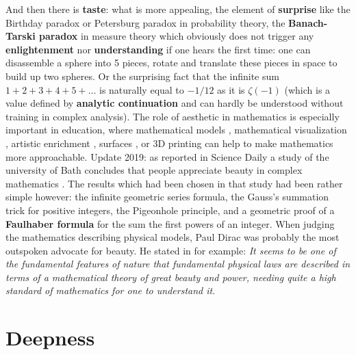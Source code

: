 \documentclass[12pt]{amsart}
\newcounter{example}    \def\example#1{ \item \fontsize{12}{15} \selectfont #1 \fontsize{12}{15} \selectfont }
\begin{document}
And then there is {\bf taste}: what is more appealing, the element of {\bf surprise} like the Birthday paradox
or Petersburg paradox in probability theory, the {\bf Banach-Tarski
paradox} in measure theory which obviously does not trigger any {\bf enlightenment} nor
{\bf understanding} if one hears the first time:
one can disassemble a sphere into 5 pieces, rotate and translate these pieces in space
to build up two spheres. Or the surprising fact that the infinite sum $1+2+3+4+5+ \dots$ 
is naturally equal to $-1/12$ as it is $\zeta(-1)$ (which is a value defined by 
{\bf analytic continuation} and can hardly be understood without training in complex analysis).
The role of aesthetic in mathematics is especially important in education, where
mathematical models \cite{FischerModels}, mathematical visualization \cite{Banchoff1990},
artistic enrichment \cite{Fomenko}, 
surfaces \cite{AnalyticSurfaces}, or 3D printing \cite{Segerman2016,CFZ} 
can help to make mathematics more approachable. 
Update 2019: as reported in Science Daily a study of the university of Bath concludes that 
people appreciate beauty in complex mathematics \cite{JohnsonSteinerberger}.
The results which had been chosen in that study had been rather simple however: 
the infinite geometric series formula, the Gauss's summation trick for positive integers,  
the Pigeonhole principle, and a geometric proof of a {\bf Faulhaber formula} for 
the sum the first powers of an integer. 
When judging the mathematics describing physical models, Paul Dirac was probably the most outspoken
advocate for beauty. He stated in \cite{Dirac1963} for example:
{\it It seems to be one of the fundamental features of nature that fundamental
physical laws are described in terms of a mathematical theory of great beauty and power, needing quite a high
standard of mathematics for one to understand it}.

\section*{Deepness}
\end{document}
